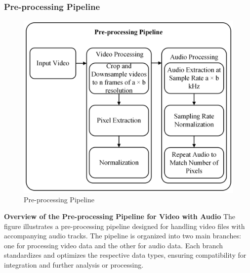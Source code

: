 \documentclass{ioereport}
\begin{document}
        \subsubsection{Pre-processing Pipeline}
        \begin{figure}[H]
            \centering
            \includegraphics[width=0.9\linewidth]{assets/Major Data Pre-Processing.png}
            \caption{Pre-processing Pipeline}
            \label{fig:pre-processing-pipeline}
        \end{figure}
        
        \textbf{Overview of the Pre-processing Pipeline for Video with Audio}
        The figure illustrates a pre-processing pipeline designed for handling video files with accompanying audio tracks. The pipeline is organized into two main branches: one for processing video data and the other for audio data. Each branch standardizes and optimizes the respective data types, ensuring compatibility for integration and further analysis or processing.
        
\end{document}
